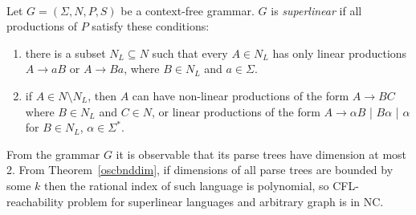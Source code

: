 \begin{example}
\\
Let $G = (\Sigma, N, P, S)$ be a context-free grammar. $G$ is \textit{superlinear} if all productions of $P$ satisfy these conditions:
\begin{enumerate}
\item there is a subset $N_L \subseteq N$ such that every $A \in N_L$ has only linear productions $A\rightarrow aB$ or $A\rightarrow Ba$, where $B \in N_L$ and $a \in \Sigma$.
\item if $A \in N \setminus N_L$, then $A$ can have non-linear productions of the form $A \rightarrow BC$ where $B\in N_L$ and $C \in N$, or linear productions of the form $A\rightarrow \alpha B$ | $B \alpha$ | $\alpha$ for $B \in N_L$, $\alpha \in \Sigma^*$.
\end{enumerate}
From the grammar $G$ it is observable that its parse trees have dimension at most 2. From 
Theorem~\ref{oscbnddim}, if dimensions of all parse trees are bounded by some $k$ then the rational index of such language is polynomial, so CFL-reachability problem for superlinear languages and arbitrary graph is in NC.
\end{example}
